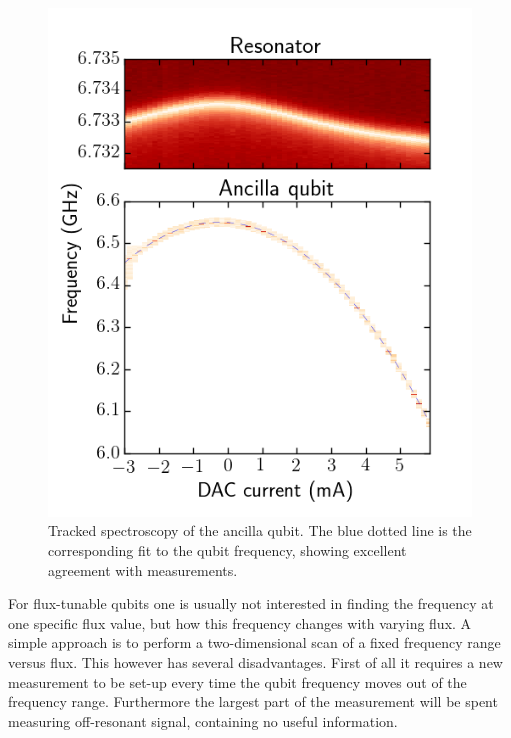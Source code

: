         \begin{figure}
          \begin{center}
          \vspace{-30pt}
            \includegraphics[width=\textwidth]{../Figures/Qubit characterization/Tracked_spectroscopy.png}
          \end{center}
          \vspace{-20 pt}
          \caption{Tracked spectroscopy of the ancilla qubit. The blue dotted line is the corresponding fit to the qubit frequency, showing excellent agreement with measurements.}
          \label{fig:tracked spectroscopy}
        \end{figure}

        For flux-tunable qubits one is usually not interested in finding the frequency at one specific flux value, but how this frequency changes with varying flux. A simple approach is to perform a two-dimensional scan of a fixed frequency range versus flux. This however has several disadvantages. First of all it requires a new measurement to be set-up every time the qubit frequency moves out of the frequency range. Furthermore the largest part of the measurement will be spent measuring off-resonant signal, containing no useful information.

